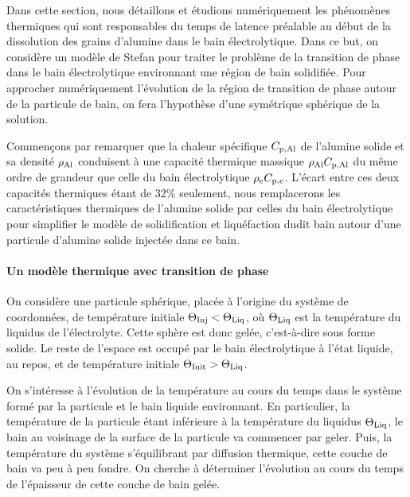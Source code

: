 Dans cette section, nous détaillons et étudions numériquement les
phénomènes thermiques qui sont responsables du temps de latence
préalable au début de la dissolution des grains d'alumine dans le bain
électrolytique. Dans ce but, on considère un modèle de Stefan pour
traiter le problème de la transition de phase dans le bain
électrolytique environnant une région de bain solidifiée. Pour
approcher numériquement l'évolution de la région de transition de
phase autour de la particule de bain, on fera l'hypothèse d'une
symétrique sphérique de la solution.

Commençons par remarquer que la chaleur spécifique $C_{\mathrm{p,Al}}$ de
l'alumine solide et sa densité $\rho_\mathrm{Al}$ conduisent à une
capacité thermique massique $\rho_\mathrm{Al}C_{\mathrm{p,Al}}$ du même ordre
de grandeur que celle du bain électrolytique
$\rho_\mathrm{e}C_{\mathrm{p,e}}$. L'écart entre ces deux capacités
thermiques étant de \num{32}\% seulement, nous remplacerons les
caractéristiques thermiques de l'alumine solide par celles du bain
électrolytique pour simplifier le modèle de solidification et
liquéfaction dudit bain autour d'une particule d'alumine solide
injectée dans ce bain.


\paragraph{Un modèle thermique avec transition de phase}
On considère une particule sphérique, placée à l'origine du système de
coordonnées, de température initiale $\Theta_\text{Inj}<\Theta_\text{Liq}$, où $\Theta_\text{Liq}$ est la
température du liquidus de l'électrolyte. Cette sphère est donc gelée,
c'est-à-dire sous forme solide. Le reste de l'espace est occupé par le
bain électrolytique à l'état liquide, au repos, et de température
initiale $\Theta_\text{Init} > \Theta_\text{Liq}$.

On s'intéresse à l'évolution de la température au cours du temps dans
le système formé par la particule et le bain liquide environnant. En
particulier, la température de la particule étant inférieure à la
température du liquidus $\Theta_\text{Liq}$, le bain au voisinage de la surface de
la particule va commencer par geler. Puis, la température du système
s'équilibrant par diffusion thermique, cette couche de bain va peu à
peu fondre. On cherche à déterminer l'évolution au cours du temps de
l'épaisseur de cette couche de bain gelée.

